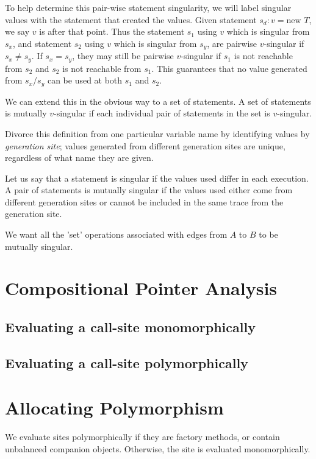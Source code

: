 \documentclass[11pt,notitlepage]{article}
\begin{document}
To help determine this pair-wise statement singularity, we will label
singular values with the statement that created the values.  Given
statement $s_d : v = \text{new }T$, we say $v$ is  after that point.  Thus the statement $s_1$ using $v$
which is singular from $s_x$, and statement $s_2$ using $v$ which is
singular from $s_y$, are pairwise $v$-singular if $s_x \neq s_y$.
If $s_x = s_y$, they may still be pairwise $v$-singular if $s_1$ is
not reachable from $s_2$ and $s_2$ is not reachable from $s_1$.  This
guarantees that no value generated from $s_x$/$s_y$ can be used at
both $s_1$ and $s_2$.

We can extend this in the obvious way to a set of statements.  A
set of statements is mutually $v$-singular if each individual pair of
statements in the set is $v$-singular.

Divorce this definition from one particular variable name by
identifying values by \textit{generation site}; values generated from
different generation sites are unique, regardless of what name they
are given.

Let us say that a statement is singular if the values used differ in
each execution.  A pair of statements is mutually singular if the
values used either come from different generation sites or cannot be
included in the same trace from the generation site.

We want all the 'set' operations associated with edges from $A$ to $B$
to be mutually singular.

\section{Compositional Pointer Analysis}

\subsection{Evaluating a call-site monomorphically}
\subsection{Evaluating a call-site polymorphically}

\section{Allocating Polymorphism}

We evaluate sites polymorphically if they are factory methods, or
contain unbalanced companion objects.  Otherwise, the site is
evaluated monomorphically.

%
\end{document}
